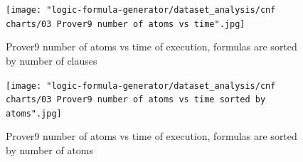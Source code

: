 \begin{figure}[h]
  \centering
  \texttt{[image: "logic-formula-generator/dataset\_analysis/cnf charts/03 Prover9 number of atoms vs time".jpg]}
  \caption{Prover9 number of atoms vs time of execution, formulas are sorted by number of clauses}
  \label{pic:Prover9NumberOfAtomsVsTime}
\end{figure}

\begin{figure}[h]
  \centering
  \texttt{[image: "logic-formula-generator/dataset\_analysis/cnf charts/03 Prover9 number of atoms vs time sorted by atoms".jpg]}
  \caption{Prover9 number of atoms vs time of execution, formulas are sorted by number of atoms}
  \label{pic:Prover9NumberOfAtomsVsTimeSortedByAtoms}
\end{figure}
